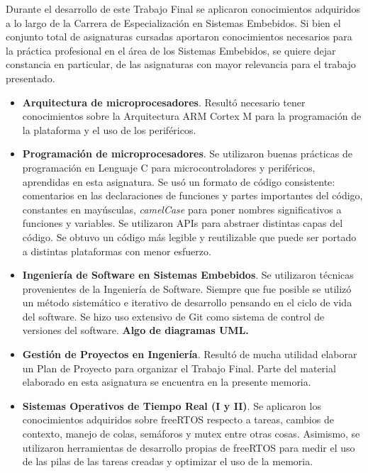 \medskip

Durante el desarrollo de este Trabajo Final se aplicaron conocimientos adquiridos a lo largo de la Carrera de Especialización en Sistemas Embebidos.  Si bien el conjunto total de asignaturas cursadas  aportaron conocimientos necesarios para la práctica profesional en el área de los Sistemas Embebidos, se quiere dejar constancia en particular, de las asignaturas con mayor relevancia para el trabajo presentado.

\begin{itemize}
\item
\textbf{Arquitectura de microprocesadores}. Resultó necesario tener conocimientos sobre la Arquitectura ARM Cortex M para la programación de la plataforma  y el uso de los periféricos.

\item
\textbf{Programación de microprocesadores}. Se utilizaron buenas prácticas de programación en Lenguaje C para microcontroladores y periféricos, aprendidas en esta asignatura. Se usó un formato de código consistente: comentarios en las declaraciones de funciones y partes importantes del código, constantes en mayúsculas, \textit{camelCase} para poner nombres significativos a funciones y variables. Se utilizaron APIs para abstraer distintas capas del código. Se obtuvo un código más legible y reutilizable que puede ser portado a distintas plataformas con menor esfuerzo.

\item
\textbf{Ingeniería de Software en Sistemas Embebidos}. Se utilizaron técnicas provenientes de la Ingeniería de Software. Siempre que fue posible se utilizó un método sistemático e iterativo de desarrollo pensando en el ciclo de vida del software. Se hizo uso extensivo de Git como sistema de control de versiones del software.  \textbf{Algo de diagramas UML.}

\item
\textbf{Gestión de Proyectos en Ingeniería}. Resultó de mucha utilidad elaborar un Plan de Proyecto para organizar el Trabajo Final.  Parte del material elaborado en esta asignatura se encuentra en la presente memoria.

\item
\textbf{Sistemas Operativos de Tiempo Real (I y II)}. Se aplicaron los conocimientos adquiridos sobre freeRTOS respecto a tareas, cambios de contexto, manejo de colas, semáforos y mutex entre otras cosas.  Asimismo, se utilizaron herramientas de desarrollo propias de freeRTOS para medir el uso de las pilas de las tareas creadas y optimizar el uso de la memoria.


\end{itemize}
